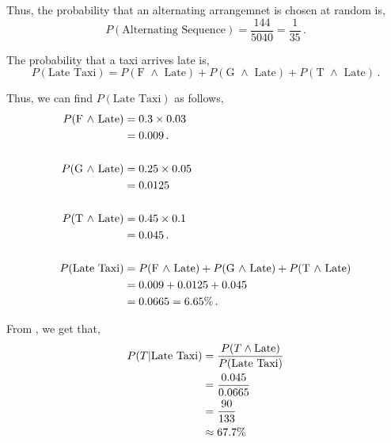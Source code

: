 \begin{subquestions}
\begin{subsubquestions}
Thus, the probability that an alternating arrangemnet is chosen at random is,
\begin{equation}
	P(\text{Alternating Sequence}) = \frac{144}{5040} = \frac{1}{35} \,.
\end{equation}

\end{subsubquestions}	
	

\subquestion

\begin{subsubquestions}
	
\subsubquestion

The probability that a taxi arrives late is,
\begin{equation}
	P(\text{Late Taxi}) = P(\text{F $\land$ Late}) + P(\text{G $\land$ Late}) + P(\text{T $\land$ Late}) \,.
\end{equation}
	
Thus, we can find $P(\text{Late Taxi})$ as follows,
\begin{align}
	P(\text{F $\land$ Late}) & = 0.3 \times 0.03 \nonumber \\
	                       & = 0.009 \,. \\ \nonumber \\
	P(\text{G $\land$ Late}) & = 0.25 \times 0.05 \nonumber \\
	 					   & = 0.0125 \, \\ \nonumber \\
	P(\text{T $\land$ Late}) & = 0.45 \times 0.1 \nonumber \\
	 					   & = 0.045 \,.  \\ \nonumber \\       
	P(\text{Late Taxi}) & = P(\text{F $\land$ Late}) + P(\text{G $\land$ Late}) + P(\text{T $\land$ Late}) \nonumber \\
	                    & = 0.009+0.0125+0.045 \nonumber \\
	                    & = 0.0665 = 6.65\% \,.					              
\end{align}


\subsubquestion

From , we get that,
\begin{align}
	P(T|\text{Late Taxi}) & = \frac{P(T \land \text{Late})}{P(\text{Late Taxi})} \nonumber \\
	                      & = \frac{0.045}{0.0665} \nonumber \\
	                      & = \frac{90}{133} \nonumber \\ 
	                      & \approx 67.7\%
\end{align}


\end{subsubquestions}
\end{subquestions}
